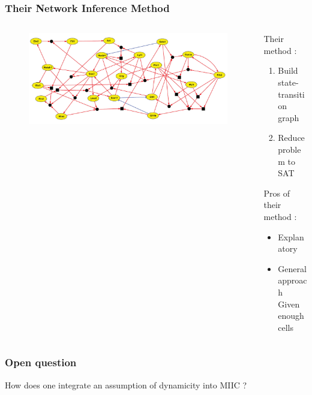 \documentclass[14pt,aspectratio=169]{beamer}
\begin{document}
\begin{frame}
	\frametitle{Their Network Inference Method}
	 	\begin{columns}[T] %
		\begin{column}{.48\textwidth}
			\begin{figure}
				\includegraphics*[width=  \linewidth]{../Biblio/images/pap_network.png}
			\end{figure}
		\end{column}%
		\hfill%
		\begin{column}{.48\textwidth}
			Their method :
			\begin{enumerate}
				\item Build state-transition graph
				\item Reduce problem to SAT
			\end{enumerate}
			Pros of their method :
			\begin{itemize}
				\item Explanatory
				\item General approach\\
				Given enough cells
			\end{itemize}
		\end{column}%
	\end{columns}
\end{frame}

\begin{frame}
	\frametitle{Open question}
	\center
	\large
	How does one integrate an assumption of dynamicity into MIIC ?
\end{frame}
\end{document}
